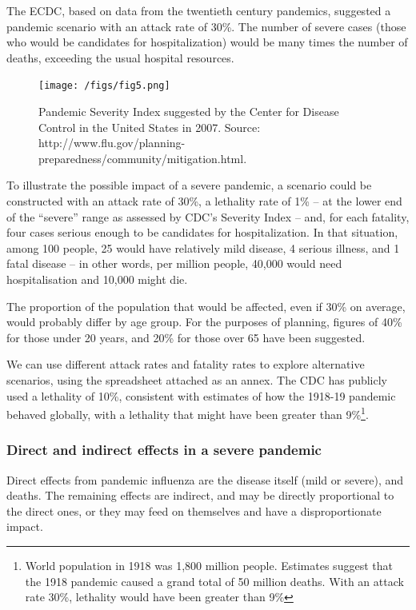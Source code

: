 \documentclass[12pt, a4]{scrartcl}
\begin{document}
The ECDC, based on data from the twentieth century pandemics, suggested a pandemic scenario with an attack rate of 30\%. The number of severe cases (those who would be candidates for hospitalization) would be many times the number of deaths, exceeding the usual hospital resources.

\begin{figure}[h]
\centering
\texttt{[image: /figs/fig5.png]}
\caption{Pandemic Severity Index suggested by the Center for Disease Control in the United States in 2007. Source:
http://www.flu.gov/planning-preparedness/community/mitigation.html.}
\end{figure}

To illustrate the possible impact of a severe pandemic, a scenario could be constructed with an attack rate of 30\%, a lethality rate of 1\% – at the lower end of the “severe” range as assessed by CDC’s Severity Index – and, for each fatality, four cases serious enough to be candidates for hospitalization. In that situation, among 100 people, 25 would have relatively mild disease, 4 serious illness, and 1 fatal disease – in other words, per million people, 40,000 would need hospitalisation and 10,000 might die.

The proportion of the population that would be affected, even if 30\% on average, would probably differ by age group. For the purposes of planning, figures of 40\% for those under 20 years, and 20\% for those over 65 have been suggested.

We can use different attack rates and fatality rates to explore alternative scenarios, using the spreadsheet attached as an annex. The CDC has publicly used a lethality of 10\%, consistent with estimates of how the 1918-19 pandemic behaved globally, with a lethality that might have been greater than 9\%\footnote{World population in 1918 was 1,800 million people. Estimates suggest that the 1918 pandemic caused a grand total of 50 million deaths. With an attack rate 30\%, lethality would have been greater than 9\%}.

\subsubsection{Direct and indirect effects in a severe pandemic}
Direct effects from pandemic influenza are the disease itself (mild or severe), and deaths. The remaining effects are indirect, and may be directly proportional to the direct ones, or they may feed on themselves and have a disproportionate impact.
\end{document}
